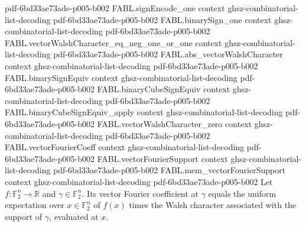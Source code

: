 \begin{theorem}
  {pdf-6bd33ae73ade-p005-b002}
\proofstep
  {FABL.signEncode_one}
  {context}
  {ghsz-combinatorial-list-decoding}
  {pdf-6bd33ae73ade-p005-b002}
\proofstep
  {FABL.binarySign_one}
  {context}
  {ghsz-combinatorial-list-decoding}
  {pdf-6bd33ae73ade-p005-b002}
\proofstep
  {FABL.vectorWalshCharacter_eq_neg_one_or_one}
  {context}
  {ghsz-combinatorial-list-decoding}
  {pdf-6bd33ae73ade-p005-b002}
\proofstep
  {FABL.abs_vectorWalshCharacter}
  {context}
  {ghsz-combinatorial-list-decoding}
  {pdf-6bd33ae73ade-p005-b002}
\proofstep
  {FABL.binarySignEquiv}
  {context}
  {ghsz-combinatorial-list-decoding}
  {pdf-6bd33ae73ade-p005-b002}
\proofstep
  {FABL.binaryCubeSignEquiv}
  {context}
  {ghsz-combinatorial-list-decoding}
  {pdf-6bd33ae73ade-p005-b002}
\proofstep
  {FABL.binaryCubeSignEquiv_apply}
  {context}
  {ghsz-combinatorial-list-decoding}
  {pdf-6bd33ae73ade-p005-b002}
\proofstep
  {FABL.vectorWalshCharacter_zero}
  {context}
  {ghsz-combinatorial-list-decoding}
  {pdf-6bd33ae73ade-p005-b002}
\proofstep
  {FABL.vectorFourierCoeff}
  {context}
  {ghsz-combinatorial-list-decoding}
  {pdf-6bd33ae73ade-p005-b002}
\proofstep
  {FABL.vectorFourierSupport}
  {context}
  {ghsz-combinatorial-list-decoding}
  {pdf-6bd33ae73ade-p005-b002}
\proofstep
  {FABL.mem_vectorFourierSupport}
  {context}
  {ghsz-combinatorial-list-decoding}
  {pdf-6bd33ae73ade-p005-b002}
Let $f\colon\mathbb F_2^n\to\mathbb R$ and $\gamma\in\mathbb F_2^n$. Its vector Fourier
coefficient at $\gamma$ equals the uniform expectation over $x\in\mathbb F_2^n$ of
$f(x)$ times the Walsh character associated with the support of $\gamma$, evaluated at
$x$.
\end{theorem}

